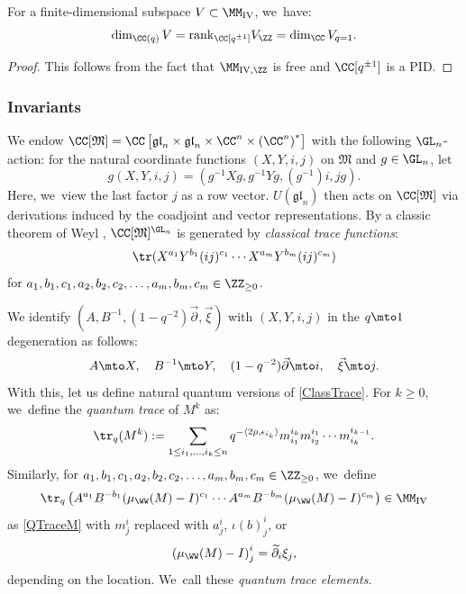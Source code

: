 \begin{prop}\label{DimProp}
For a finite-dimensional subspace $V\subset\MM_{\mathrm{IV}}$, we~have:
\begin{equation}
\dim_{\CC(q)}V= \mathrm{rank}_{\CC[q^{\pm 1}]}V_\ZZ =\dim_{\CC}V_{q=1}.
\label{DimBound}
\end{equation}
\end{prop}

\begin{proof}
This follows from the fact that $\MM_{\mathrm{IV,\ZZ}}$ is free and $\CC[q^{\pm 1}]$ is a PID.
\end{proof}

\subsubsection{Invariants}
We endow $\CC[\mathfrak{M}]=\CC\left[\mathfrak{gl}_n\times\mathfrak{gl}_n\times\CC^n\times\left(\CC^n\right)^*\right]$ with the following $\GL_n$-action:
for the natural coordinate functions $(X,Y,i,j)$ on $\mathfrak{M}$ and $g\in \GL_n$, let
\[
g(X,Y,i,j)=(g^{-1}Xg, g^{-1}Yg, (g^{-1})i, jg).
\]
Here, we~view the last factor $j$ as a row vector.
$U(\mathfrak{gl}_n)$ then acts on $\CC[\mathfrak{M}]$ via derivations induced by the coadjoint and vector representations.
By a classic theorem of Weyl \cite{WeylInv}, $\CC[\mathfrak{M}]^{\GL_n}$ is generated by \textit{classical trace functions}:
\begin{equation}
\tr(X^{a_1}Y^{b_1}(i j)^{c_1}\cdots X^{a_m}Y^{b_m}(i j)^{c_m})
\label{ClassTrace}
\end{equation}
for $a_1,b_1,c_1, a_2,b_2, c_2,\ldots, a_m,b_m, c_m\in\ZZ_{\ge 0}$.

We identify $(A,B^{-1},(1-q^{-2})\vec{\partial},\vec{\xi})$ with $(X,Y,i,j)$ in the $q\mto 1$ degeneration as follows:
\begin{equation}
A\mto X,\quad B^{-1}\mto Y,\quad (1-q^{-2})\vec{\partial}\mto i,\quad \vec{\xi}\mto j.
\label{DegenTrans}
\end{equation}
With this, let us define natural quantum versions of \eqref{ClassTrace}.
For $k\ge 0$, we~define the \textit{quantum trace} of $M^k$ as:
\begin{equation}
\tr_q(M^k):=\sum_{1\le i_1,\ldots, i_k\le n} q^{-\langle 2\rho,\epsilon_{i_k}\rangle} m^{i_k}_{i_1}m^{i_1}_{i_2}\cdots m^{i_{k-1}}_{i_{k}}.
\label{QTraceM}
\end{equation}
Similarly, for $a_1,b_1,c_1, a_2,b_2, c_2,\ldots, a_m,b_m, c_m\in\ZZ_{\ge 0}$, we~define
\begin{equation}
\tr_q\left(A^{a_1}B^{-b_1}(\mu_{\WW}(M)-I)^{c_1}\cdots A^{a_m}B^{-b_m}(\mu_{\WW}(M)-I)^{c_m}\right)\in\MM_{\mathrm{IV}}
\label{QTrace}
\end{equation}
as \eqref{QTraceM} with $m_{j}^i$ replaced with $a^{i}_j$, $\iota(b)^{i}_j$, or
\[
\left(\mu_{\WW}(M)-I \right)^i_j=\widetilde{\partial}_i\xi_j,
\]
depending on the location. We~call these \textit{quantum trace elements}.

